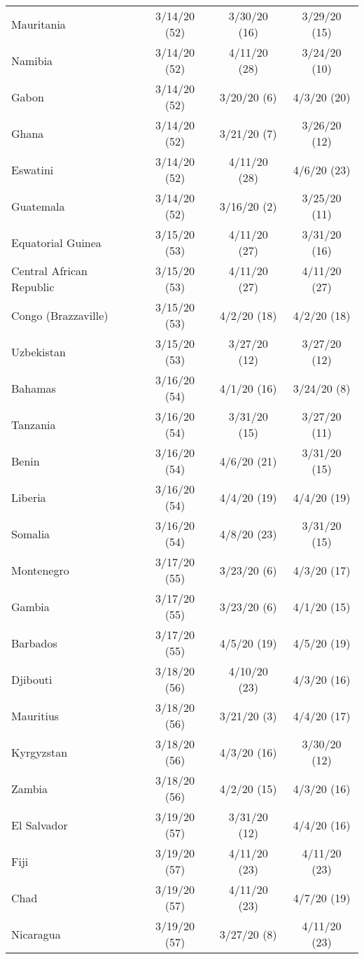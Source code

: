 \begin{table}[h]
\begin{longtable}{p{} c c c}
Mauritania & 3/14/20 (52)  & 3/30/20 (16)  & 3/29/20 (15) \\
Namibia & 3/14/20 (52)  & 4/11/20 (28)  & 3/24/20 (10) \\
Gabon & 3/14/20 (52)  & 3/20/20 (6)  & 4/3/20 (20) \\
Ghana & 3/14/20 (52)  & 3/21/20 (7)  & 3/26/20 (12) \\
Eswatini & 3/14/20 (52)  & 4/11/20 (28)  & 4/6/20 (23) \\
Guatemala & 3/14/20 (52)  & 3/16/20 (2)  & 3/25/20 (11) \\
\hline 
Equatorial Guinea & 3/15/20 (53)  & 4/11/20 (27)  & 3/31/20 (16) \\
Central African Republic & 3/15/20 (53)  & 4/11/20 (27)  & 4/11/20 (27) \\
Congo (Brazzaville) & 3/15/20 (53)  & 4/2/20 (18)  & 4/2/20 (18) \\
Uzbekistan & 3/15/20 (53)  & 3/27/20 (12)  & 3/27/20 (12) \\
\hline 
Bahamas & 3/16/20 (54)  & 4/1/20 (16)  & 3/24/20 (8) \\
Tanzania & 3/16/20 (54)  & 3/31/20 (15)  & 3/27/20 (11) \\
Benin & 3/16/20 (54)  & 4/6/20 (21)  & 3/31/20 (15) \\
Liberia & 3/16/20 (54)  & 4/4/20 (19)  & 4/4/20 (19) \\
Somalia & 3/16/20 (54)  & 4/8/20 (23)  & 3/31/20 (15) \\
\hline 
Montenegro & 3/17/20 (55)  & 3/23/20 (6)  & 4/3/20 (17) \\
Gambia & 3/17/20 (55)  & 3/23/20 (6)  & 4/1/20 (15) \\
Barbados & 3/17/20 (55)  & 4/5/20 (19)  & 4/5/20 (19) \\
\hline 
Djibouti & 3/18/20 (56)  & 4/10/20 (23)  & 4/3/20 (16) \\
Mauritius & 3/18/20 (56)  & 3/21/20 (3)  & 4/4/20 (17) \\
Kyrgyzstan & 3/18/20 (56)  & 4/3/20 (16)  & 3/30/20 (12) \\
Zambia & 3/18/20 (56)  & 4/2/20 (15)  & 4/3/20 (16) \\
\hline 
El Salvador & 3/19/20 (57)  & 3/31/20 (12)  & 4/4/20 (16) \\
Fiji & 3/19/20 (57)  & 4/11/20 (23)  & 4/11/20 (23) \\
Chad & 3/19/20 (57)  & 4/11/20 (23)  & 4/7/20 (19) \\
Nicaragua & 3/19/20 (57)  & 3/27/20 (8)  & 4/11/20 (23) \\

\end{longtable}
\end{table}
